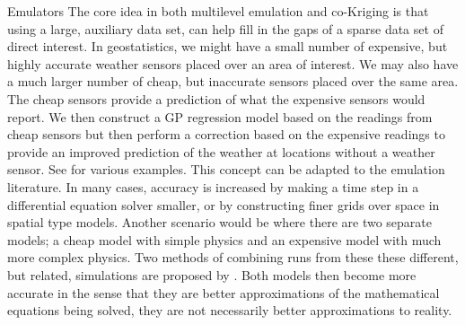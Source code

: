\begin{chapter}{Emulators \label{Ch:Emulators}}
The core idea in both multilevel emulation and co-Kriging is that using a large, auxiliary data set, can help fill in the gaps of a sparse data set of direct interest. In geostatistics, we might have a small number of expensive, but highly accurate weather sensors placed over an area of interest. We may also have a much larger number of cheap, but inaccurate sensors placed over the same area. The cheap sensors provide a prediction of what the expensive sensors would report. We then construct a GP regression model based on the readings from cheap sensors but then perform a correction based on the expensive readings to provide an improved prediction of the weather at locations without a weather sensor. See \citet{Yates1987,Ashraf1997,Lark2007,Adhikary2017} for various examples.
This concept can be adapted to the emulation literature. In many cases, accuracy is increased by making a time step in a differential equation solver smaller, or by constructing finer grids over space in spatial type models. Another scenario would be where there are two separate models; a cheap model with simple physics and an expensive model with much more complex physics.
Two methods of combining runs from these these different, but related, simulations are proposed by \citet{Kennedy2000}. Both models then become more accurate in the sense that they are better approximations of the mathematical equations being solved, they are not necessarily better approximations to reality.

\end{chapter}
